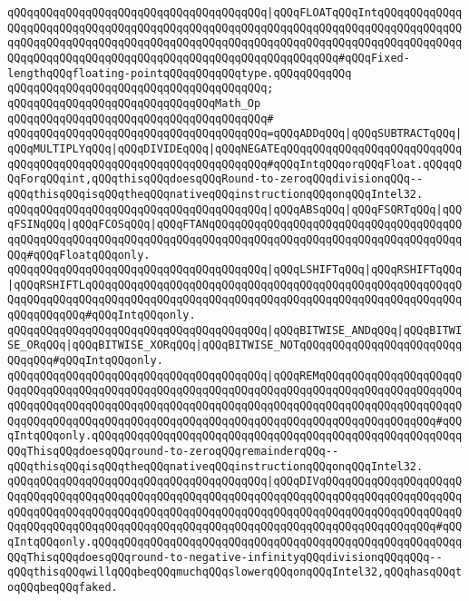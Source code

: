 \verb|qQQqqQQqqQQqqQQqqQQqqQQqqQQqqQQqqQQqqQQq|\verb#|qQQqFLOATqQQqIntqQQqqQQqqQQqqQQqqQQqqQQqqQQqqQQqqQQqqQQqqQQqqQQqqQQqqQQqqQQqqQQqqQQqqQQqqQQqqQQqqQQqqQQqqQQqqQQqqQQqqQQqqQQqqQQqqQQqqQQqqQQqqQQqqQQqqQQqqQQqqQQqqQQqqQQqqQQqqQQqqQQqqQQqqQQqqQQqqQQqqQQqqQQqqQQqqQQqqQQqqQQq#\verb|#qQQqFixed-lengthqQQqfloating-pointqQQqqQQqqQQqtype.qQQqqQQqqQQq|\newline
\verb|qQQqqQQqqQQqqQQqqQQqqQQqqQQqqQQqqQQqqQQq;|\newline
\newline
\verb|qQQqqQQqqQQqqQQqqQQqqQQqqQQqqQQqMath_Op|\newline
\verb|qQQqqQQqqQQqqQQqqQQqqQQqqQQqqQQqqQQqqQQq#|\newline
\verb|qQQqqQQqqQQqqQQqqQQqqQQqqQQqqQQqqQQqqQQq=qQQqADDqQQq|\verb#|qQQqSUBTRACTqQQq|qQQqMULTIPLYqQQq|qQQqDIVIDEqQQq|qQQqNEGATEqQQqqQQqqQQqqQQqqQQqqQQqqQQqqQQqqQQqqQQqqQQqqQQqqQQqqQQqqQQqqQQqqQQq#\verb|#qQQqIntqQQqorqQQqFloat.qQQqqQQqForqQQqint,qQQqthisqQQqdoesqQQqRound-to-zeroqQQqdivisionqQQq--qQQqthisqQQqisqQQqtheqQQqnativeqQQqinstructionqQQqonqQQqIntel32.|\newline
\verb|qQQqqQQqqQQqqQQqqQQqqQQqqQQqqQQqqQQqqQQq|\verb#|qQQqABSqQQq|qQQqFSQRTqQQq|qQQqFSINqQQq|qQQqFCOSqQQq|qQQqFTANqQQqqQQqqQQqqQQqqQQqqQQqqQQqqQQqqQQqqQQqqQQqqQQqqQQqqQQqqQQqqQQqqQQqqQQqqQQqqQQqqQQqqQQqqQQqqQQqqQQqqQQqqQQqqQQq#\verb|#qQQqFloatqQQqonly.|\newline
\verb|qQQqqQQqqQQqqQQqqQQqqQQqqQQqqQQqqQQqqQQq|\verb#|qQQqLSHIFTqQQq|qQQqRSHIFTqQQq|qQQqRSHIFTLqQQqqQQqqQQqqQQqqQQqqQQqqQQqqQQqqQQqqQQqqQQqqQQqqQQqqQQqqQQqqQQqqQQqqQQqqQQqqQQqqQQqqQQqqQQqqQQqqQQqqQQqqQQqqQQqqQQqqQQqqQQqqQQqqQQqqQQqqQQq#\verb|#qQQqIntqQQqonly.|\newline
\verb|qQQqqQQqqQQqqQQqqQQqqQQqqQQqqQQqqQQqqQQq|\verb#|qQQqBITWISE_ANDqQQq|qQQqBITWISE_ORqQQq|qQQqBITWISE_XORqQQq|qQQqBITWISE_NOTqQQqqQQqqQQqqQQqqQQqqQQqqQQqqQQq#\verb|#qQQqIntqQQqonly.|\newline
\verb|qQQqqQQqqQQqqQQqqQQqqQQqqQQqqQQqqQQqqQQq|\verb#|qQQqREMqQQqqQQqqQQqqQQqqQQqqQQqqQQqqQQqqQQqqQQqqQQqqQQqqQQqqQQqqQQqqQQqqQQqqQQqqQQqqQQqqQQqqQQqqQQqqQQqqQQqqQQqqQQqqQQqqQQqqQQqqQQqqQQqqQQqqQQqqQQqqQQqqQQqqQQqqQQqqQQqqQQqqQQqqQQqqQQqqQQqqQQqqQQqqQQqqQQqqQQqqQQqqQQqqQQqqQQqqQQqqQQqqQQq#\verb|#qQQqIntqQQqonly.qQQqqQQqqQQqqQQqqQQqqQQqqQQqqQQqqQQqqQQqqQQqqQQqqQQqqQQqqQQqThisqQQqdoesqQQqround-to-zeroqQQqremainderqQQq--qQQqthisqQQqisqQQqtheqQQqnativeqQQqinstructionqQQqonqQQqIntel32.|\newline
\verb|qQQqqQQqqQQqqQQqqQQqqQQqqQQqqQQqqQQqqQQq|\verb#|qQQqDIVqQQqqQQqqQQqqQQqqQQqqQQqqQQqqQQqqQQqqQQqqQQqqQQqqQQqqQQqqQQqqQQqqQQqqQQqqQQqqQQqqQQqqQQqqQQqqQQqqQQqqQQqqQQqqQQqqQQqqQQqqQQqqQQqqQQqqQQqqQQqqQQqqQQqqQQqqQQqqQQqqQQqqQQqqQQqqQQqqQQqqQQqqQQqqQQqqQQqqQQqqQQqqQQqqQQqqQQqqQQqqQQqqQQq#\verb|#qQQqIntqQQqonly.qQQqqQQqqQQqqQQqqQQqqQQqqQQqqQQqqQQqqQQqqQQqqQQqqQQqqQQqqQQqThisqQQqdoesqQQqround-to-negative-infinityqQQqdivisionqQQqqQQq--qQQqthisqQQqwillqQQqbeqQQqmuchqQQqslowerqQQqonqQQqIntel32,qQQqhasqQQqtoqQQqbeqQQqfaked.|\newline
